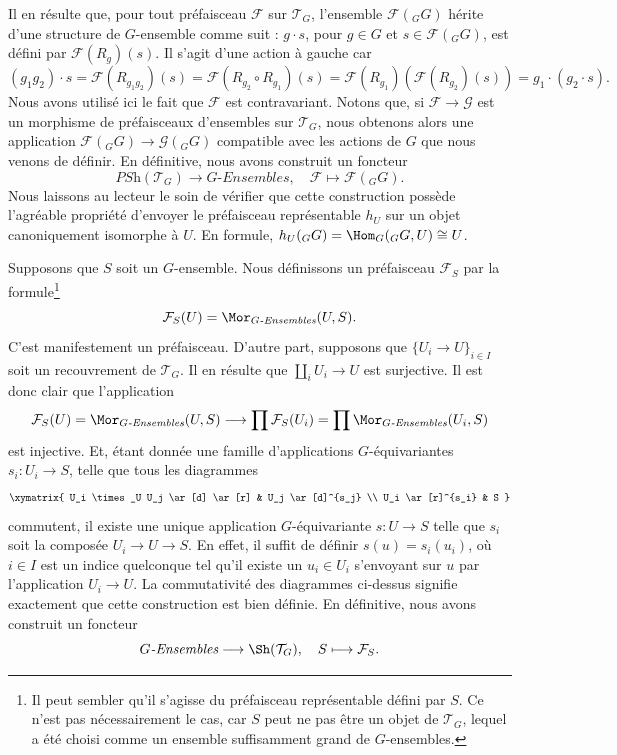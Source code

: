 \medskip\noindent
Il en résulte que, pour tout préfaisceau $\mathcal{F}$ sur $\mathcal{T}_G$,
l’ensemble $\mathcal{F}({}_GG)$ hérite d’une structure de $G$-ensemble
comme suit : $g \cdot s$, pour $g \in G$ et $s \in \mathcal{F}({}_GG)$,
est défini par $\mathcal{F}(R_g)(s)$. Il s’agit d’une action à gauche
car
$$
(g_1g_2) \cdot s  = \mathcal{F}(R_{g_1g_2})(s) =
\mathcal{F}(R_{g_2}\circ R_{g_1})(s) =
\mathcal{F}(R_{g_1})( \mathcal{F}(R_{g_2})(s)) =
g_1 \cdot (g_2 \cdot s).
$$
Nous avons utilisé ici le fait que $\mathcal{F}$
est contravariant. Notons que, si $\mathcal{F} \to \mathcal{G}$
est un morphisme de préfaisceaux d’ensembles sur $\mathcal{T}_G$,
nous obtenons alors une application $\mathcal{F}({}_GG) \to \mathcal{G}({}_GG)$
compatible avec les actions de $G$ que nous venons de définir.
En définitive, nous avons construit un foncteur
$$
\textit{PSh}(\mathcal{T}_G)
\longrightarrow
G\textit{-Ensembles}, \quad
\mathcal{F}
\longmapsto
\mathcal{F}({}_GG).
$$
Nous laissons au lecteur le soin de vérifier que cette construction
possède l’agréable propriété d’envoyer le préfaisceau représentable
$h_U$ sur un objet canoniquement isomorphe à $U$.
En formule, $h_U({}_GG) = \Hom_G({}_GG, U) \cong U$.

\medskip\noindent
Supposons que $S$ soit un $G$-ensemble. Nous définissons un préfaisceau
$\mathcal{F}_S$ par la formule\footnote{Il peut sembler qu’il s’agisse du
préfaisceau représentable défini par $S$. Ce n’est pas nécessairement le cas,
car $S$ peut ne pas être un objet de $\mathcal{T}_G$, lequel a été choisi
comme un ensemble suffisamment grand de $G$-ensembles.}
$$
\mathcal{F}_S(U)
=
\Mor_{G\textit{-Ensembles}}(U, S).
$$
C’est manifestement un préfaisceau. D’autre part, supposons que
$\{U_i \to U\}_{i\in I}$ soit un recouvrement de $\mathcal{T}_G$.
Il en résulte que $\coprod_i U_i \to U$ est surjective. Il est donc
clair que l’application
$$
\mathcal{F}_S(U)
=
\Mor_{G\textit{-Ensembles}}(U, S)
\longrightarrow
\prod \mathcal{F}_S(U_i)
=
\prod \Mor_{G\textit{-Ensembles}}(U_i, S)
$$
est injective. Et, étant donnée une famille d’applications
$G$-équivariantes $s_i : U_i \to S$, telle que tous les diagrammes
$$
\xymatrix{
U_i \times_U U_j \ar[d] \ar[r]
&
U_j \ar[d]^{s_j}
\\
U_i \ar[r]^{s_i}
&
S
}
$$
commutent, il existe une unique application $G$-équivariante
$s : U \to S$ telle que $s_i$ soit la composée
$U_i \to U \to S$. En effet, il suffit de définir $s(u) = s_i(u_i)$,
où $i\in I$ est un indice quelconque tel qu’il existe un
$u_i \in U_i$ s’envoyant sur $u$ par l’application $U_i \to U$.
La commutativité des diagrammes ci-dessus signifie exactement
que cette construction est bien définie. En définitive, nous avons
construit un foncteur
$$
G\textit{-Ensembles}
\longrightarrow
\Sh(\mathcal{T}_G), \quad
S
\longmapsto
\mathcal{F}_S
.
$$

